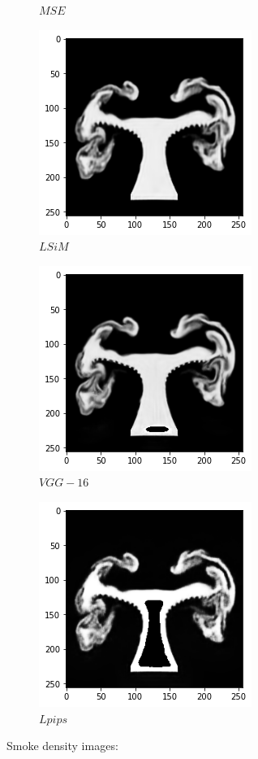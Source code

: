 \documentclass[a4paper,12pt,twoside]{report}
\begin{document}
\begin{figure}
\begin{subfigure}{0.32\textwidth}
		\caption{$MSE$}
	\end{subfigure}
	\begin{subfigure}{0.32\textwidth}
		\centering
		\includegraphics[scale=0.4]{superresolution/density_lsim.png}
		\caption{$LSiM$}
	\end{subfigure}
	\begin{subfigure}{0.32\textwidth}
		\centering
		\includegraphics[scale=0.4]{superresolution/density_vgg.png}
		\caption{$VGG-16$}
	\end{subfigure}
	\begin{subfigure}{0.32\textwidth}
		\centering
		\includegraphics[scale=0.4]{superresolution/density_lpips.png}
		\caption{$Lpips$}
	\end{subfigure}
	\caption{Smoke density images:}
\end{figure}
\end{document}
